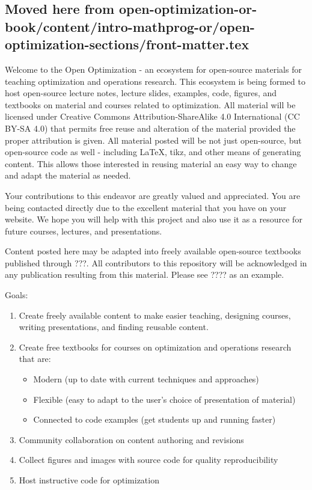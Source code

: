 \hypertarget{moved-here-from-open-optimization-or-bookcontentintro-mathprog-oropen-optimization-sectionsfront-matter.tex}{%
\subsection{Moved here from
open-optimization-or-book/content/intro-mathprog-or/open-optimization-sections/front-matter.tex}\label{moved-here-from-open-optimization-or-bookcontentintro-mathprog-oropen-optimization-sectionsfront-matter.tex}}

Welcome to the Open Optimization - an ecosystem for open-source
materials for teaching optimization and operations research. This
ecosystem is being formed to host open-source lecture notes, lecture
slides, examples, code, figures, and textbooks on material and courses
related to optimization. All material will be licensed under Creative
Commons Attribution-ShareAlike 4.0 International (CC BY-SA 4.0) that
permits free reuse and alteration of the material provided the proper
attribution is given. All material posted will be not just open-source,
but open-source code as well - including LaTeX, tikz, and other means of
generating content. This allows those interested in reusing material an
easy way to change and adapt the material as needed.

Your contributions to this endeavor are greatly valued and appreciated.
You are being contacted directly due to the excellent material that you
have on your website. We hope you will help with this project and also
use it as a resource for future courses, lectures, and presentations.

Content posted here may be adapted into freely available open-source
textbooks published through ???. All contributors to this repository
will be acknowledged in any publication resulting from this material.
Please see ???? as an example.

Goals:

\begin{enumerate}
\def\labelenumi{\arabic{enumi}.}
\item
  Create freely available content to make easier teaching, designing
  courses, writing presentations, and finding reusable content.
\item
  Create free textbooks for courses on optimization and operations
  research that are:

  \begin{itemize}
  \tightlist
  \item
    Modern (up to date with current techniques and approaches)
  \item
    Flexible (easy to adapt to the user's choice of presentation of
    material)
  \item
    Connected to code examples (get students up and running faster)
  \end{itemize}
\item
  Community collaboration on content authoring and revisions
\item
  Collect figures and images with source code for quality
  reproducibility
\item
  Host instructive code for optimization
\end{enumerate}

